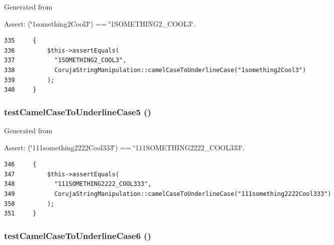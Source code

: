 Generated from \begin{Desc}
\item[Assert:](\char`\"{}1something2Cool3\char`\"{}) == \char`\"{}1SOMETHING2\_\-COOL3\char`\"{}. \end{Desc}


\begin{Code}\begin{verbatim}335     {
336         $this->assertEquals(
337           "1SOMETHING2_COOL3",
338           CorujaStringManipulation::camelCaseToUnderlineCase("1something2Cool3")
339         );
340     }
\end{verbatim}
\end{Code}


\hypertarget{class_coruja_string_manipulation_test_5472d5a7ebdb46d7730f415a7d4a9c8d}{
\subsubsection[{testCamelCaseToUnderlineCase5}]{\setlength{\rightskip}{0pt plus 5cm}testCamelCaseToUnderlineCase5 ()}}
\label{class_coruja_string_manipulation_test_5472d5a7ebdb46d7730f415a7d4a9c8d}


Generated from \begin{Desc}
\item[Assert:](\char`\"{}111something2222Cool333\char`\"{}) == \char`\"{}111SOMETHING2222\_\-COOL333\char`\"{}. \end{Desc}


\begin{Code}\begin{verbatim}346     {
347         $this->assertEquals(
348           "111SOMETHING2222_COOL333",
349           CorujaStringManipulation::camelCaseToUnderlineCase("111something2222Cool333")
350         );
351     }
\end{verbatim}
\end{Code}


\hypertarget{class_coruja_string_manipulation_test_25efbbc54e2501dc4fa6efa523bc5d4c}{
\subsubsection[{testCamelCaseToUnderlineCase6}]{\setlength{\rightskip}{0pt plus 5cm}testCamelCaseToUnderlineCase6 ()}}
\label{class_coruja_string_manipulation_test_25efbbc54e2501dc4fa6efa523bc5d4c}


